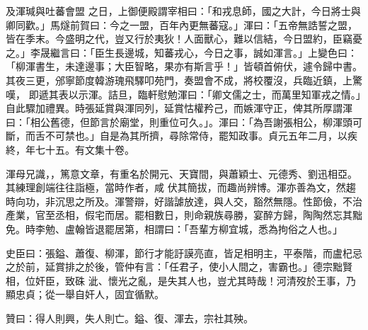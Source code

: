 \begin{pinyinscope}
 及渾瑊與吐蕃會盟
 之日，上御便殿謂宰相曰：「和戎息師，國之大計，今日將士與卿同歡。」馬燧前賀曰：今之一盟，百年內更無蕃寇。」渾曰：「五帝無誥誓之盟，皆在季末。今盛明之代，豈又行於夷狄！人面獸心，難以信結，今日盟約，臣竊憂之。」李晟繼言曰：「臣生長邊城，知蕃戎心，今日之事，誠如渾言。」上變色曰：「柳渾書生，未達邊事；大臣智略，果亦有斯言乎！」皆頓首俯伏，遽令歸中書。其夜三更，邠寧節度韓游瑰飛驛叩苑門，奏盟會不成，將校覆沒，兵臨近鎮，上驚嘆，
 即遞其表以示渾。詰旦，臨軒慰勉渾曰：「卿文儒之士，而萬里知軍戎之情。」自此驟加禮異。時張延賞與渾同列，延賞怙權矜己，而嫉渾守正，俾其所厚謂渾曰：「相公舊德，但節言於廟堂，則重位可久。」。渾曰：「為吾謝張相公，柳渾頭可斷，而舌不可禁也。」自是為其所擠，尋除常侍，罷知政事。貞元五年二月，以疾終，年七十五。有文集十卷。



 渾母兄識，，篤意文章，有重名於開元、天寶間，與蕭穎士、元德秀、劉迅相亞。其練理創端往往詣極，當時作者，咸
 伏其簡拔，而趣尚辨博。渾亦善為文，然趨時向功，非沉思之所及。渾警辯，好諧謔放達，與人交，豁然無隱。性節儉，不治產業，官至丞相，假宅而居。罷相數日，則命親族尋勝，宴醉方歸，陶陶然忘其黜免。時李勉、盧翰皆退罷居第，相謂曰：「吾輩方柳宜城，悉為拘俗之人也。」



 史臣曰：張鎰、蕭復、柳渾，節行才能訏謨亮直，皆足相明主，平泰階，而盧杞忌之於前，延賞排之於後，管仲有言：「任君子，使小人間之，害霸也。」德宗黜賢相，位奸臣，致硃
 泚、懷光之亂，是失其人也，豈尤其時哉！河清歿於王事，乃顯忠貞；從一舉自奸人，固宜循默。



 贊曰：得人則興，失人則亡。鎰、復、渾去，宗社其殃。



\end{pinyinscope}